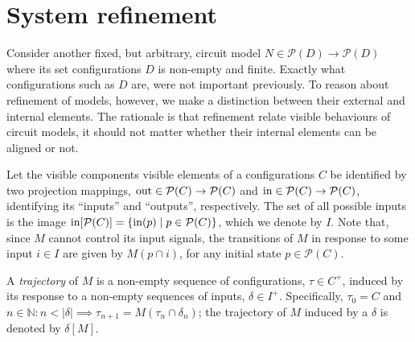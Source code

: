 \section{System refinement}

Consider another fixed, but arbitrary, circuit model $N \in \mathcal{P}(D) \rightarrow \mathcal{P}(D)$ where its set configurations $D$ is non-empty and finite. Exactly what configurations such as $D$ are, were not important previously. To reason about refinement of models, however, we make a distinction between their external and internal elements. The rationale is that refinement relate visible behaviours of circuit models, it should not matter whether their internal elements can be aligned or not.

Let the visible components visible elements of a configurations $C$ be identified by two projection mappings, $\operatorname{out} \in \mathcal{P}(C) \rightarrow \mathcal{P}(C)$ and $\operatorname{in} \in \mathcal{P}(C) \rightarrow \mathcal{P}(C)$, identifying its ``inputs'' and ``outputs'', respectively. The set of all possible inputs is the image $\operatorname{in}[\mathcal{P}(C)] = \{ \operatorname{in}(p) \mid p \in \mathcal{P}(C) \}$, which we denote by $I$. Note that, since $M$ cannot control its input signals, the transitions of $M$ in response to some input $i \in I$ are given by $M(p \cap i)$, for any initial state $p \in \mathcal{P}(C)$.

A \textit{trajectory} of $M$ is a non-empty sequence of configurations, $\tau \in C^{+}$, induced by its response to a non-empty sequences of inputs, $\delta \in I^{+}$. Specifically, $\tau_{0} = C$ and $n \in \mathbb{N} : n < | \delta | \implies \tau_{n+1} = M(\tau_{n} \cap \delta_{n})$; the trajectory of $M$ induced by a $\delta$ is denoted by $\delta[M]$.
